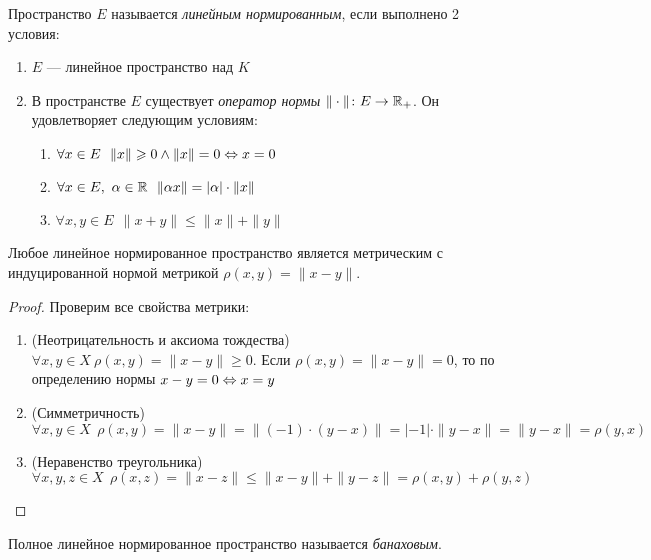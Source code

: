 \begin{definition}
	Пространство $E$ называется \textit{линейным нормированным}, если выполнено 2 условия:
	\begin{enumerate}
		\item $E$ --- линейное пространство над $K$
		
		\item В пространстве $E$ существует \textit{оператор нормы} $\|\cdot\| \colon E \to \mathbb{R}_+$. Он удовлетворяет следующим условиям:
		\begin{enumerate}
			\item $\forall x \in E\ \ \|x\| \geqslant 0 \wedge \|x\| = 0 \Leftrightarrow x = 0$
			
			\item $\forall x \in E,\ \alpha \in \R\ \ \|\alpha x\| = |\alpha| \cdot \|x\|$
			
			\item $\forall x, y \in E\ \ \|x  + y\| \le \|x\| + \|y\|$
		\end{enumerate}
	\end{enumerate}
\end{definition}

\begin{proposition}
	Любое линейное нормированное пространство является метрическим с индуцированной нормой метрикой $\rho(x, y) = \|x - y\|$.
\end{proposition}

\begin{proof}
	Проверим все свойства метрики:
	\begin{enumerate}
		\item (Неотрицательность и аксиома тождества) $\forall x, y \in X\ \rho(x, y) = \|x - y\| \ge 0$. Если $\rho(x, y) = \|x - y\| = 0$, то по определению нормы $x - y = 0 \Leftrightarrow x = y$
		
		\item (Симметричность) 
		\[
			\forall x, y \in X\ \ \rho(x, y) = \|x - y\| = \|(-1) \cdot (y - x)\| = |-1| \cdot \|y - x\| = \|y - x\| = \rho(y, x)
		\]
		
		\item (Неравенство треугольника) 
		\[
			\forall x, y, z \in X\ \ \rho(x, z) = \|x - z\| \le \|x - y\| + \|y - z\| = \rho(x, y) + \rho(y, z)
		\]
	\end{enumerate}
\end{proof}

\begin{definition}
	Полное линейное нормированное пространство называется \textit{банаховым}.
\end{definition}

